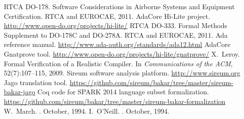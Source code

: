 \begin{thebibliography}{10}
RTCA DO-178. 
\newblock Software Considerations in Airborne Systems and Equipment 
Certification. RTCA and EUROCAE, 2011.
%
AdaCore {Hi-Lite} project. 
\newblock \url{http://www.open-do.org/projects/hi-lite/}
RTCA DO-333. 
\newblock Formal Methods Supplement to DO-178C and DO-278A. 
RTCA and EUROCAE, 2011.
{Ada} reference manual.
\newblock \url{http://www.ada-auth.org/standards/ada12.html}
AdaCore {Gnatprove} tool.
\newblock \url{http://www.open-do.org/projects/hi-lite/gnatprove/}
%
X.~Leroy. 
Formal Verification of a Realistic Compiler. 
\newblock In {\em Communications of the ACM}, 52(7):107--115, 2009.
{Sireum} software analysis platform.
\newblock \url{http://www.sireum.org}
{Jago} translation tool.
\newblock \url{https://github.com/sireum/bakar/tree/master/sireum-bakar-jago}
%
Coq code for SPARK 2014 language subset formalization.
\newblock \url{https://github.com/sireum/bakar/tree/master/sireum-bakar-formalization}
W.~March.
. 
October, 1994.
I.~O'Neill.
.
October, 1994.

\end{thebibliography}
